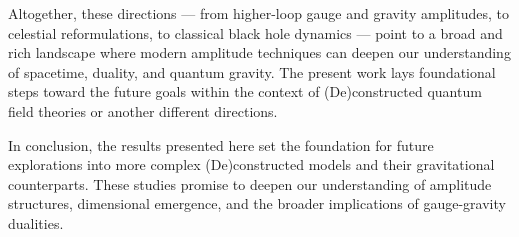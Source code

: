 \documentclass[12pt]{article}
\numberwithin{equation}{section}
\begin{document}
Altogether, these directions — from higher-loop gauge and gravity amplitudes, to celestial reformulations, to classical black hole dynamics — point to a broad and rich landscape where modern amplitude techniques can deepen our understanding of spacetime, duality, and quantum gravity. The present work lays foundational steps toward the future goals within the context of (De)constructed quantum field theories or another different directions. 

In conclusion, the results presented here set the foundation for future explorations into more complex (De)constructed models and their gravitational counterparts. These studies promise to deepen our understanding of amplitude structures, dimensional emergence, and the broader implications of gauge-gravity dualities.






\end{document}
